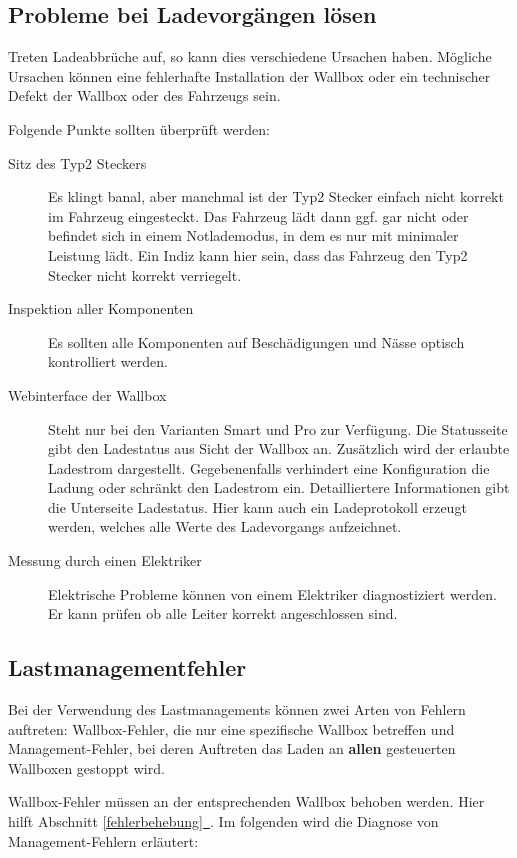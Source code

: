 \documentclass[a4paper,10pt]{article}
\newcommand*{\fullref}[1]{Abschnitt \hyperref[{#1}]{\ref*{#1}~\nameref*{#1}}}
\begin{document}
\begin{multicols*}{2}
    \subsection{Probleme bei Ladevorgängen lösen}
    Treten Ladeabbrüche auf, so kann dies verschiedene Ursachen haben. Mögliche
    Ursachen können eine fehlerhafte Installation der Wallbox oder ein
    technischer Defekt der Wallbox oder des Fahrzeugs sein.

    Folgende Punkte sollten überprüft werden:
    \begin{description}
        \item[Sitz des Typ2 Steckers] Es klingt banal, aber manchmal ist der
        Typ2 Stecker einfach nicht korrekt im Fahrzeug eingesteckt. Das    Fahrzeug
        lädt dann ggf. gar nicht oder befindet sich in einem Notlademodus, in
        dem es nur mit minimaler Leistung lädt. Ein Indiz kann hier sein, dass
        das Fahrzeug den Typ2 Stecker nicht korrekt verriegelt.
        \item[Inspektion aller Komponenten] Es sollten alle Komponenten
        auf Beschädigungen und Nässe optisch kontrolliert werden.
        \item[Webinterface der Wallbox] Steht nur bei den Varianten Smart und
        Pro zur Verfügung. Die Statusseite gibt den Ladestatus aus
        Sicht der Wallbox an. Zusätzlich wird der erlaubte Ladestrom
        dargestellt. Gegebenenfalls verhindert eine Konfiguration die Ladung
        oder schränkt den Ladestrom ein. Detailliertere Informationen gibt die
        Unterseite Ladestatus. Hier kann auch ein Ladeprotokoll
        erzeugt werden, welches alle Werte des Ladevorgangs aufzeichnet.
        \item[Messung durch einen Elektriker] Elektrische Probleme können von
        einem Elektriker diagnostiziert werden. Er kann prüfen ob alle Leiter
        korrekt angeschlossen sind.
    \end{description}

    \subsection{Lastmanagementfehler}
    Bei der Verwendung des Lastmanagements können zwei Arten von Fehlern auftreten: Wallbox-Fehler, die nur eine spezifische Wallbox betreffen und Management-Fehler,
    bei deren Auftreten das Laden an \textbf{allen} gesteuerten Wallboxen gestoppt wird.

    Wallbox-Fehler müssen an der entsprechenden Wallbox behoben werden. Hier hilft \fullref{fehlerbehebung}. Im folgenden wird die Diagnose von Management-Fehlern erläutert:


\end{multicols*}
\end{document}
